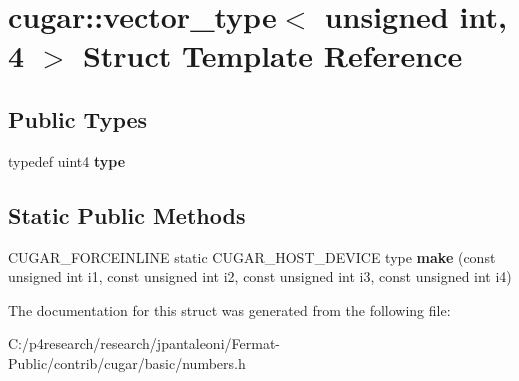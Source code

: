 \hypertarget{structcugar_1_1vector__type_3_01unsigned_01int_00_014_01_4}{}\section{cugar\+:\+:vector\+\_\+type$<$ unsigned int, 4 $>$ Struct Template Reference}
\label{structcugar_1_1vector__type_3_01unsigned_01int_00_014_01_4}
\subsection*{Public Types}
\begin{DoxyCompactItemize}
\item 
\mbox{\label{structcugar_1_1vector__type_3_01unsigned_01int_00_014_01_4_a759bbb1f908f7f000b4048665c18770d}} 
typedef uint4 {\bfseries type}
\end{DoxyCompactItemize}
\subsection*{Static Public Methods}
\begin{DoxyCompactItemize}
\item 
\mbox{\label{structcugar_1_1vector__type_3_01unsigned_01int_00_014_01_4_a20e3a0d469ea248019d953817ed7f14a}} 
C\+U\+G\+A\+R\+\_\+\+F\+O\+R\+C\+E\+I\+N\+L\+I\+NE static C\+U\+G\+A\+R\+\_\+\+H\+O\+S\+T\+\_\+\+D\+E\+V\+I\+CE type {\bfseries make} (const unsigned int i1, const unsigned int i2, const unsigned int i3, const unsigned int i4)
\end{DoxyCompactItemize}


The documentation for this struct was generated from the following file\+:\begin{DoxyCompactItemize}
\item 
C\+:/p4research/research/jpantaleoni/\+Fermat-\/\+Public/contrib/cugar/basic/numbers.\+h\end{DoxyCompactItemize}
